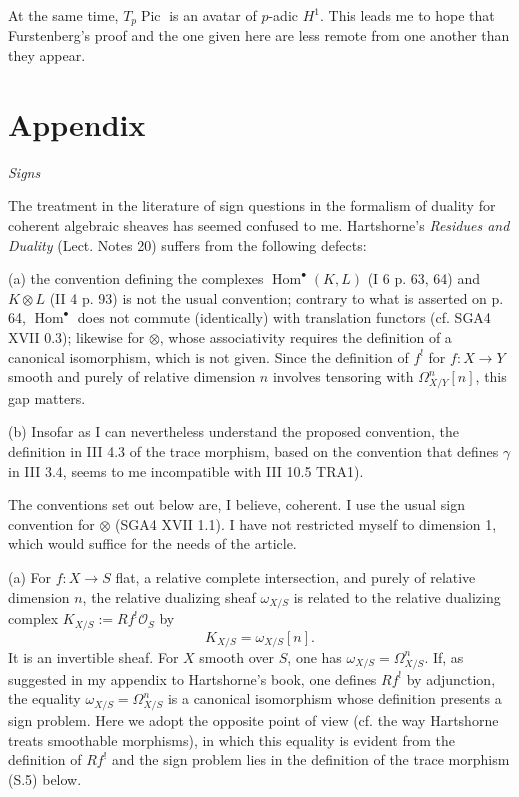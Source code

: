 \documentclass[11pt,leqno]{article}
\DeclareMathOperator{\Pic}{Pic}
\DeclareMathOperator{\Hom}{Hom}
\newcommand{\OO}{\mathcal O}
\begin{document}
At the same time, $T_p\Pic$ is an avatar of $p$-adic $H^1$. This leads me to hope that Furstenberg's proof and the one given here are less remote from one another than they appear.

\section*{Appendix}
{\large\itshape Signs}\par
\medskip

The treatment in the literature of sign questions in the formalism of duality for coherent algebraic sheaves has seemed confused to me. Hartshorne's \emph{Residues and Duality} (Lect. Notes 20) suffers from the following defects:

\noindent (a) the convention defining the complexes $\Hom^{\bullet}(K,L)$ (I 6 p. 63, 64) and $K\otimes L$ (II 4 p. 93) is not the usual convention; contrary to what is asserted on p. 64, $\Hom^{\bullet}$ does not commute (identically) with translation functors (cf. SGA4 XVII 0.3); likewise for $\otimes$, whose associativity requires the definition of a canonical isomorphism, which is not given. Since the definition of $f^!$ for $f:X\to Y$ smooth and purely of relative dimension $n$ involves tensoring with $\Omega^n_{X/Y}[n]$, this gap matters.

\noindent (b) Insofar as I can nevertheless understand the proposed convention, the definition in III 4.3 of the trace morphism, based on the convention that defines $\gamma$ in III 3.4, seems to me incompatible with III 10.5 TRA1).

The conventions set out below are, I believe, coherent. I use the usual sign convention for $\otimes$ (SGA4 XVII 1.1). I have not restricted myself to dimension 1, which would suffice for the needs of the article.

\noindent (a) For $f:X\to S$ flat, a relative complete intersection, and purely of relative dimension $n$, the relative dualizing sheaf $\omega_{X/S}$ is related to the relative dualizing complex $K_{X/S}:=Rf^!\OO_S$ by
\begin{equation}
        K_{X/S}=\omega_{X/S}[n]. \tag{S.1}
\end{equation}
It is an invertible sheaf. For $X$ smooth over $S$, one has $\omega_{X/S}=\Omega^n_{X/S}$. If, as suggested in my appendix to Hartshorne's book, one defines $Rf^!$ by adjunction, the equality $\omega_{X/S}=\Omega^n_{X/S}$ is a canonical isomorphism whose definition presents a sign problem. Here we adopt the opposite point of view (cf. the way Hartshorne treats smoothable morphisms), in which this equality is evident from the definition of $Rf^!$ and the sign problem lies in the definition of the trace morphism (S.5) below.
\end{document}
